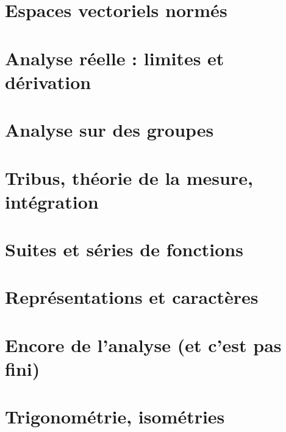 \documentclass[a4paper,twoside,11pt]{book}
\begin{document}
\chapter{Espaces vectoriels normés}





\chapter{Analyse réelle : limites et dérivation}










\chapter{Analyse sur des groupes}


\chapter{Tribus, théorie de la mesure, intégration}






\chapter{Suites et séries de fonctions}





\chapter{Représentations et caractères}


\chapter{Encore de l'analyse (et c'est pas fini)}





\chapter{Trigonométrie, isométries}








\end{document}
